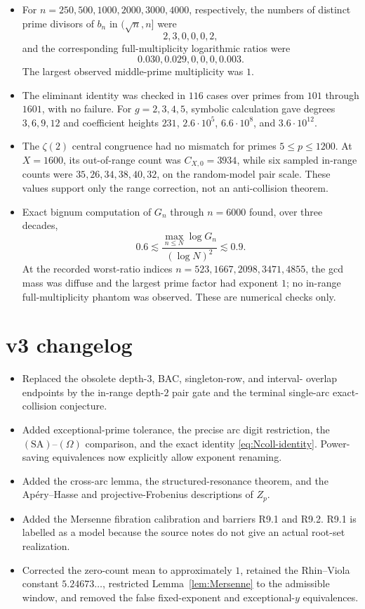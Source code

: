 \documentclass[11pt]{amsart}
\theoremstyle{plain}
\theoremstyle{remark}
\begin{document}
\begin{itemize}
\item For $n=250,500,1000,2000,3000,4000$, respectively, the numbers of
distinct prime divisors of $b_n$ in $(\sqrt n,n]$ were
\[
 2,3,0,0,0,2,
\]
and the corresponding full-multiplicity logarithmic ratios were
\[
 0.030,0.029,0,0,0,0.003.
\]
The largest observed middle-prime
multiplicity was $1$.

\item The eliminant identity was checked in $116$ cases over primes from
$101$ through $1601$, with no failure.  For $g=2,3,4,5$, symbolic
calculation gave degrees $3,6,9,12$ and coefficient heights
$231$, $2.6\cdot10^5$, $6.6\cdot10^8$, and $3.6\cdot10^{12}$.

\item The $\zeta(2)$ central congruence had no mismatch for primes
$5\leq p\leq1200$.  At $X=1600$, its out-of-range count was
$C_{X,0}=3934$, while six sampled in-range counts were
$35,26,34,38,40,32$, on the random-model pair scale.  These values
support only the range correction, not an anti-collision theorem.

\item Exact bignum computation of $G_n$ through $n=6000$ found, over
three decades,
\[
 0.6\lesssim
 \frac{\max_{n\leq N}\log G_n}{(\log N)^2}
 \lesssim0.9.
\]
At the recorded worst-ratio indices
$n=523, 1667, 2098, 3471, 4855$, the gcd mass was diffuse and the
largest prime factor had exponent $1$; no in-range full-multiplicity
phantom was observed.  These are numerical checks only.
\end{itemize}

\section{v3 changelog}

\begin{itemize}
\item Replaced the obsolete depth-$3$, BAC, singleton-row, and interval-
overlap endpoints by the in-range depth-$2$ pair gate and the terminal
single-arc exact-collision conjecture.
\item Added exceptional-prime tolerance, the precise arc digit
restriction, the $(\mathrm{SA})$--$(\Omega)$ comparison, and the exact
identity \eqref{eq:Ncoll-identity}.  Power-saving equivalences now
explicitly allow exponent renaming.
\item Added the cross-arc lemma, the structured-resonance theorem, and
the Ap\'ery--Hasse and projective-Frobenius descriptions of $Z_p$.
\item Added the Mersenne fibration calibration and barriers R9.1 and
R9.2.  R9.1 is labelled as a model because the source notes do not give
an actual root-set realization.
\item Corrected the zero-count mean to approximately $1$, retained the
Rhin--Viola constant $5.24673\ldots$, restricted Lemma~\ref{lem:Mersenne}
to the admissible window, and removed the false fixed-exponent and
exceptional-$y$ equivalences.
\end{itemize}
\end{document}
